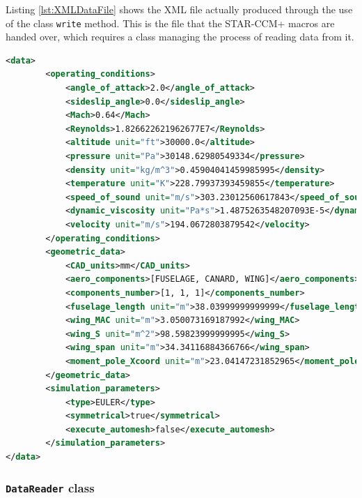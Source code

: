 \bigskip
\noindent
Listing \ref{lst:XMLDataFile} shows the XML file actually produced through the use of the class \lstinline[language=Java]!write! method. This is the file that the STAR-CCM+ macros are handed over, which requires a class managing the process of reading data from it. 
% 
\bigskip
\begin{lstlisting}[caption={STAR-CCM+ macro input data file}, captionpos=b, tabsize=6, language=XML, label={lst:XMLDataFile}]
<data>
    	<operating_conditions>
        	<angle_of_attack>2.0</angle_of_attack>
        	<sideslip_angle>0.0</sideslip_angle>
        	<Mach>0.64</Mach>
       		<Reynolds>1.826622621962677E7</Reynolds>
        	<altitude unit="ft">30000.0</altitude>
        	<pressure unit="Pa">30148.62980549334</pressure>
        	<density unit="kg/m^3">0.45904041459985995</density>
        	<temperature unit="K">228.79937393459855</temperature>
        	<speed_of_sound unit="m/s">303.23012560617843</speed_of_sound>
        	<dynamic_viscosity unit="Pa*s">1.4875263548207093E-5</dynamic_viscosity>
        	<velocity unit="m/s">194.0672803879542</velocity>
    	</operating_conditions>
    	<geometric_data>
        	<CAD_units>mm</CAD_units>
        	<aero_components>[FUSELAGE, CANARD, WING]</aero_components>
        	<components_number>[1, 1, 1]</components_number>
        	<fuselage_length unit="m">38.03999999999999</fuselage_length>
        	<wing_MAC unit="m">3.050073169187992</wing_MAC>
        	<wing_S unit="m^2">98.59823999999995</wing_S>
        	<wing_span unit="m">34.34116884366766</wing_span>
        	<moment_pole_Xcoord unit="m">23.04147231852965</moment_pole_Xcoord>
    	</geometric_data>
    	<simulation_parameters>
        	<type>EULER</type>
        	<symmetrical>true</symmetrical>
        	<execute_automesh>false</execute_automesh>
    	</simulation_parameters>
</data>
\end{lstlisting}

\subsubsection{\texttt{DataReader} class}

